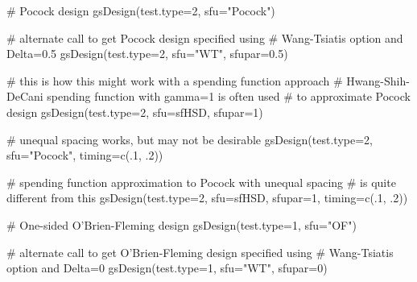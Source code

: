 \begin{Examples}
\begin{ExampleCode}
# Pocock design
gsDesign(test.type=2, sfu="Pocock")

# alternate call to get Pocock design specified using 
# Wang-Tsiatis option and Delta=0.5
gsDesign(test.type=2, sfu="WT", sfupar=0.5)

# this is how this might work with a spending function approach
# Hwang-Shih-DeCani spending function with gamma=1 is often used 
# to approximate Pocock design
gsDesign(test.type=2, sfu=sfHSD, sfupar=1)

# unequal spacing works,  but may not be desirable 
gsDesign(test.type=2, sfu="Pocock", timing=c(.1, .2))

# spending function approximation to Pocock with unequal spacing 
# is quite different from this
gsDesign(test.type=2, sfu=sfHSD, sfupar=1, timing=c(.1, .2))

# One-sided O'Brien-Fleming design
gsDesign(test.type=1, sfu="OF")

# alternate call to get O'Brien-Fleming design specified using 
# Wang-Tsiatis option and Delta=0
gsDesign(test.type=1, sfu="WT", sfupar=0)
\end{ExampleCode}
\end{Examples}

